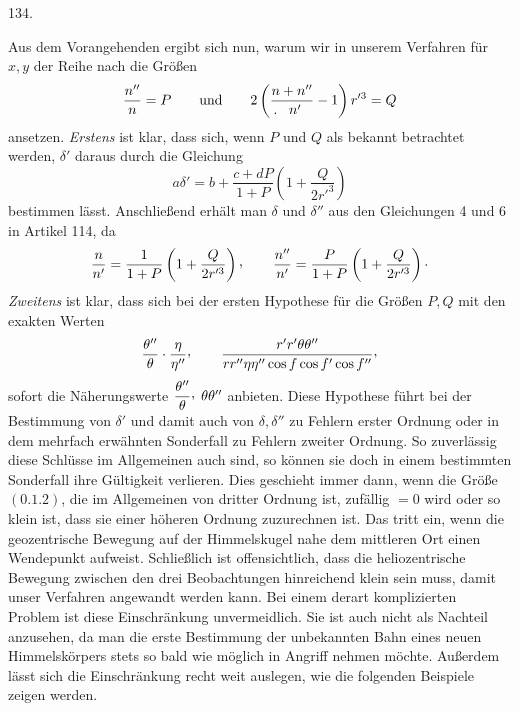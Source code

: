 \par{}\medskip
\begin{center}\hypertarget{native-180-article134}{}134.\end{center}
Aus dem Vorangehenden ergibt sich nun, warum wir in unserem Verfahren für $x,y$ der Reihe nach
die Größen
\[
\frac{n''}{n}=P\qquad\text{und}\qquad
2\left(\frac{n+n''}{\mathpunct{\mkern-12mu.\mkern12mu}n'}-1\right)r'^3=Q
\]
ansetzen. \textit{Erstens} ist klar, dass sich, wenn $P$ und $Q$ als bekannt betrachtet
werden, $\delta'$ daraus durch die Gleichung
\[
a\delta'=b+\frac{c+dP}{1+P}\left(1+\frac{Q}{2r'^3}\right)
\]
bestimmen lässt. Anschließend erhält man $\delta$ und $\delta''$ aus den Gleichungen 4 und 6 in Artikel
114, da
\[
\frac{n}{n'}=\frac{1}{1+P}\left(1+\frac{Q}{2r'^3}\right)\mathpunct{\raisebox{.45ex}{,}}\qquad
\frac{n''}{n'}=\frac{P}{1+P}\left(1+\frac{Q}{2r'^3}\right)\mathpunct{\cdot}
\]
\textit{Zweitens} ist klar, dass sich bei der ersten Hypothese für die Größen $P,Q$ mit den
exakten Werten
\hypertarget{native-181}{}
\[
\frac{\theta''}{\theta}\cdot\frac{\eta}{\eta''}\mathpunct{\raisebox{.45ex}{,}}\qquad
\frac{r'r'\theta\theta''}{rr''\eta\eta''\cos f\cos f'\cos f''}\mathpunct{\raisebox{.45ex}{,}}
\]
sofort die Näherungswerte $\dfrac{\theta''}{\theta}\mathpunct{\raisebox{.45ex}{,}}\;\theta\theta''$ anbieten. Diese Hypothese führt bei der Bestimmung von $\delta'$
und damit auch von $\delta,\delta''$ zu Fehlern erster Ordnung oder in dem mehrfach erwähnten Sonderfall zu
Fehlern zweiter Ordnung. So zuverlässig diese Schlüsse im Allgemeinen auch sind, so können sie
doch in einem bestimmten Sonderfall ihre Gültigkeit verlieren. Dies geschieht immer dann, wenn
die Größe $(0.1.2)$, die im Allgemeinen von dritter Ordnung ist, zufällig $=0$ wird oder so klein
ist, dass sie einer höheren Ordnung zuzurechnen ist. Das tritt ein, wenn die geozentrische
Bewegung auf der Himmelskugel nahe dem mittleren Ort einen Wendepunkt aufweist. Schließlich ist
offensichtlich, dass die heliozentrische Bewegung zwischen den drei Beobachtungen hinreichend
klein sein muss, damit unser Verfahren angewandt werden kann. Bei einem derart komplizierten
Problem ist diese Einschränkung unvermeidlich. Sie ist auch nicht als Nachteil anzusehen, da man
die erste Bestimmung der unbekannten Bahn eines neuen Himmelskörpers stets so bald wie möglich
in Angriff nehmen möchte. Außerdem lässt sich die Einschränkung recht weit auslegen, wie die
folgenden Beispiele zeigen werden.
